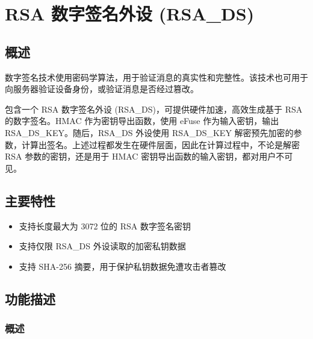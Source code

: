 \documentclass[main\_\_CN.tex]{subfiles}
\begin{document}

\ifglobal
\else
    {\let\clearpage\relax \listoftodos}
    \tableofcontents
\fi




\chapter{RSA 数字签名外设 (RSA\_DS)}
\label{mod:digsig}
\hypertarget{digsig}{}\hypertarget{rsads}{}


\section{概述}

数字签名技术使用密码学算法，用于验证消息的真实性和完整性。该技术也可用于向服务器验证设备身份，或验证消息是否经过篡改。

\chipname{} 包含一个 RSA 数字签名外设 (RSA\_DS)，可提供硬件加速，高效生成基于 RSA 的数字签名。HMAC 作为密钥导出函数，使用 eFuse 作为输入密钥，输出 RSA\_DS\_KEY。随后，RSA\_DS 外设使用 RSA\_DS\_KEY 解密预先加密的参数，计算出签名。上述过程都发生在硬件层面，因此在计算过程中，不论是解密 RSA 参数的密钥，还是用于 HMAC 密钥导出函数的输入密钥，都对用户不可见。

\section{主要特性}

\begin{itemize}
\item 支持长度最大为 3072 位的 RSA 数字签名密钥
\item 支持仅限 RSA\_DS 外设读取的加密私钥数据
\item 支持 SHA-256 摘要，用于保护私钥数据免遭攻击者篡改
\end{itemize}


\section{功能描述}
\subsection{概述}
\end{document}
